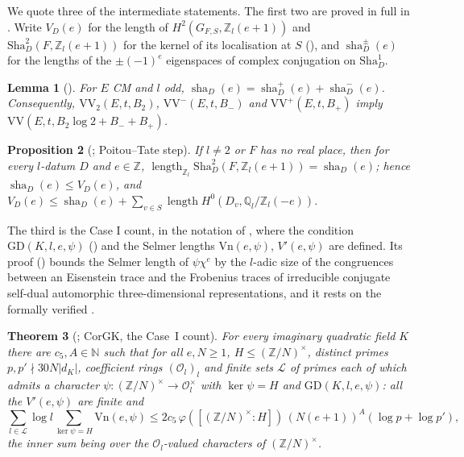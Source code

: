\documentclass[10pt]{amsart}
\newtheorem{theorem}{Theorem}[section]
\newtheorem{proposition}[theorem]{Proposition}
\newtheorem{lemma}[theorem]{Lemma}
\theoremstyle{definition}
\theoremstyle{remark}
\newcommand{\N}{\mathbb N}
\newcommand{\Z}{\mathbb Z}
\newcommand{\Q}{\mathbb Q}
\begin{document}
We quote three of the intermediate statements. The first two are proved
in full in \cite{Annex}. Write $V_D(e)$ for the length of
$H^2(G_{F,S},\Z_l(e+1))$ and $\mathrm{Sha}^2_D(F,\Z_l(e+1))$ for the kernel of
its localisation at $S$ (\cite[Definition~\ref{A-i5:def-ldata}]{Annex}), and
$\operatorname{sha}^\pm_D(e)$ for the lengths of the $\pm(-1)^e$
eigenspaces of complex conjugation on $\mathrm{Sha}^1_D$.

\begin{lemma}[{\cite[Lemma~\ref{A-i5:lem-split}]{Annex}}]\label{inp:lem-split}
For $E$ CM and $l$ odd, $\operatorname{sha}_D(e)=\operatorname{sha}^+_D(e)+\operatorname{sha}^-_D(e)$.
Consequently, $\mathrm{VV}_2(E,t,B_2)$, $\mathrm{VV}^-(E,t,B_-)$ and
$\mathrm{VV}^+(E,t,B_+)$ imply $\mathrm{VV}(E,t,B_2\log2+B_-+B_+)$.
\end{lemma}

\begin{proposition}[{\cite[Proposition~\ref{A-i5:prop-shaleV}]{Annex}}; Poitou--Tate step]\label{inp:prop-shaleV}
If $l\ne2$ or $F$ has no real place, then for every $l$-datum $D$ and $e\in\Z$,
$\operatorname{length}_{\Z_l}\mathrm{Sha}^2_D(F,\Z_l(e+1))=\operatorname{sha}_D(e)$; hence
$\operatorname{sha}_D(e)\le V_D(e)$, and
$V_D(e)\le\operatorname{sha}_D(e)+\sum_{v\in S}\operatorname{length} H^0(D_v,\Q_l/\Z_l(-e))$.
\end{proposition}

\noindent The third is the Case I count, in the notation of
\cite[\S\ref{A-i5:ssec-counts}]{Annex}, where the condition
$\mathrm{GD}(K,l,e,\psi)$ (\cite[Definition~\ref{A-i5:def-gd}]{Annex}) and the
Selmer lengths $\mathrm{Vn}(e,\psi)$, $V'(e,\psi)$ are defined. Its proof
(\cite[\S\ref{A-i5:ssec-pf-counts}]{Annex}) bounds the Selmer length of
$\psi\chi^e$ by the $l$-adic size of the congruences between an Eisenstein
trace and the Frobenius traces of irreducible conjugate self-dual
automorphic three-dimensional representations, and it rests on the
formally verified \cite[Propositions~\ref{A-i5:x5-prop-U1},
\ref{A-i5:x5-prop-U234}, \ref{A-i5:x5-prop-U4}, \ref{A-i5:x-prop:u3count}]{Annex}.

\begin{theorem}[{\cite[Theorem~\ref{A-i5:prop-corg}]{Annex}}; $\mathrm{CorGK}$, the Case~I count]\label{inp:thm-corg}
For every imaginary quadratic field $K$ there are $c_5,A\in\N$ such that for
all $e,N\ge1$, $H\le(\Z/N)^\times$, distinct primes $p,p'\nmid30N|d_K|$,
coefficient rings $(\mathcal O_l)_l$ and finite sets $\mathcal L$ of primes each
of which admits a character $\psi\colon(\Z/N)^\times\to\mathcal O_l^\times$ with
$\ker\psi=H$ and $\mathrm{GD}(K,l,e,\psi)$: all the $V'(e,\psi)$
are finite and
\[
\sum_{l\in\mathcal L}\log l\sum_{\ker\psi=H}\mathrm{Vn}(e,\psi)\le2c_5\,\varphi([(\Z/N)^\times:H])\,(N(e+1))^A(\log p+\log p'),
\]
the inner sum being over the $\mathcal O_l$-valued characters of $(\Z/N)^\times$.
\end{theorem}
\end{document}
